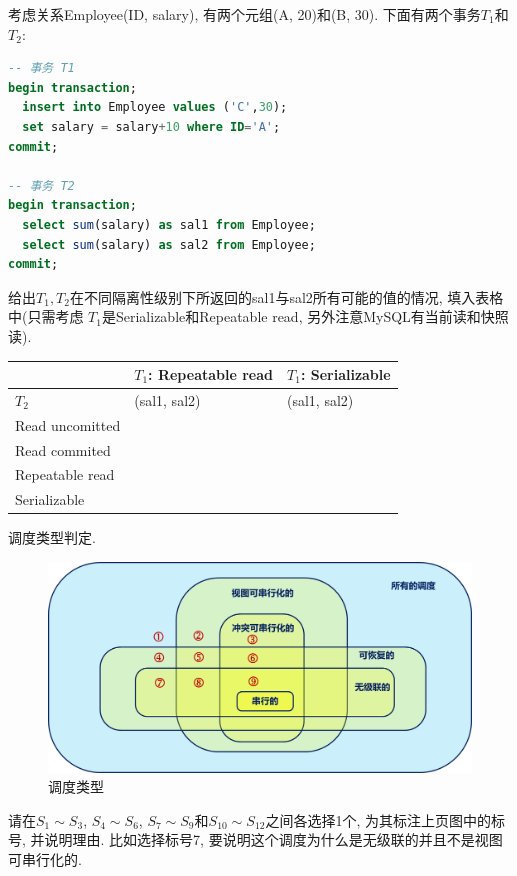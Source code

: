 \begin{problemset}
  \item 考虑关系Employee(ID, salary), 有两个元组(A, 20)和(B, 30).
  下面有两个事务$T_1$和$T_2$:
  \begin{lstlisting}[language=SQL]
-- 事务 T1
begin transaction;
  insert into Employee values ('C',30);
  set salary = salary+10 where ID='A';
commit;

-- 事务 T2
begin transaction;
  select sum(salary) as sal1 from Employee;
  select sum(salary) as sal2 from Employee;
commit;
  \end{lstlisting}
  给出$T_1, T_2$在不同隔离性级别下所返回的sal1与sal2所有可能的值的情况, 填入表格中(只需考虑
$T_1$是Serializable和Repeatable read, 另外注意MySQL有当前读和快照读).
  
\begin{table}[H]
  \centering
  \begin{tabular}{|l|l|l|}
    \hline
    & \textbf{$T_1$: Repeatable read} & \textbf{$T_1$: Serializable} \\ \hline
    $T_2$ & (sal1, sal2) & (sal1, sal2) \\ \hline
    Read uncomitted & & \\ \hline
    Read commited & & \\ \hline
    Repeatable read & & \\ \hline
    Serializable & & \\ \hline
  \end{tabular}
\end{table}

  \item 调度类型判定. 
  \begin{figure}[H]
      \centering
      \includegraphics[width=.6\textwidth]{figure/image-20250520104027538.png}
      \caption{调度类型}
  \end{figure}
  请在$S_1\sim S_3$, $S_4\sim S_6$, $S_7\sim S_9$和$S_{10}\sim S_{12}$之间各选择1个, 为其标注上页图中的标号, 并说明理由. 比如选择标号7, 要说明这个调度为什么是无级联的并且不是视图可串行化的.


\end{problemset}
